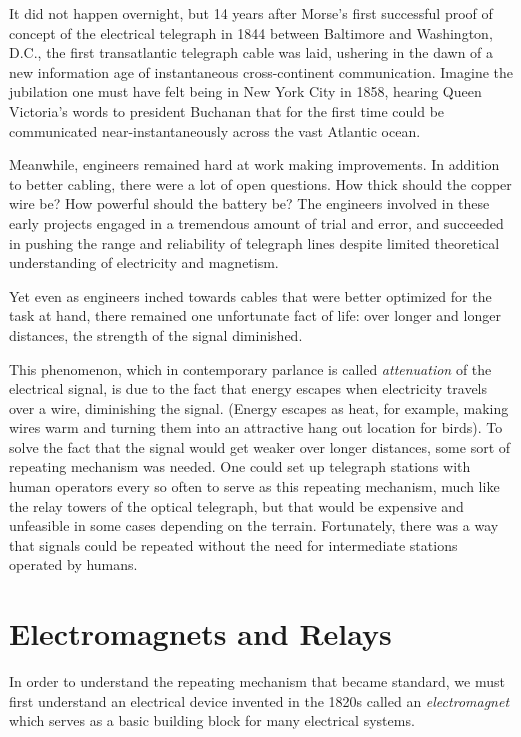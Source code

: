 \documentclass[UTF8]{book}
\begin{document}
\begin{CJK}{UTF8}{gbsn}
It did not happen overnight, but 14 years after Morse's first successful proof of concept of the electrical telegraph in 1844 between Baltimore and Washington, D.C., the first transatlantic telegraph cable was laid, ushering in the dawn of a new information age of instantaneous cross-continent communication. Imagine the jubilation one must have felt being in New York City in 1858, hearing Queen Victoria's words to president Buchanan that for the first time could be communicated near-instantaneously across the vast Atlantic ocean.

Meanwhile, engineers remained hard at work making improvements. In addition to better cabling, there were a lot of open questions. How thick should the copper wire be? How powerful should the battery be? The engineers involved in these early projects engaged in a tremendous amount of trial and error, and succeeded in pushing the range and reliability of telegraph lines despite limited theoretical understanding of electricity and magnetism.

Yet even as engineers inched towards cables that were better optimized for the task at hand, there remained one unfortunate fact of life: over longer and longer distances, the strength of the signal diminished.

This phenomenon, which in contemporary parlance is called \emph{attenuation} of the electrical signal, is due to the fact that energy escapes when electricity travels over a wire, diminishing the signal. (Energy escapes as heat, for example, making wires warm and turning them into an attractive hang out location for birds). To solve the fact that the signal would get weaker over longer distances, some sort of repeating mechanism was needed. One could set up telegraph stations with human operators every so often to serve as this repeating mechanism, much like the relay towers of the optical telegraph, but that would be expensive and unfeasible in some cases depending on the terrain. Fortunately, there was a way that signals could be repeated without the need for intermediate stations operated by humans.

\section{Electromagnets and Relays}

In order to understand the repeating mechanism that became standard, we must first understand an electrical device invented in the 1820s called an \emph{electromagnet} which serves as a basic building block for many electrical systems.


\end{CJK}
\end{document}
